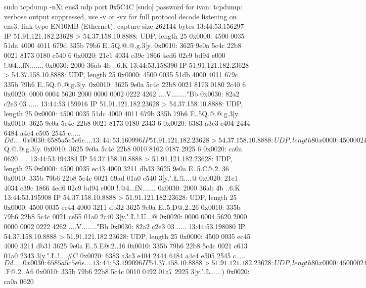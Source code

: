 sudo tcpdump -nXi ens3 udp port 0x5C4C
[sudo] password for ivan: 
tcpdump: verbose output suppressed, use -v or -vv for full protocol decode
listening on ens3, link-type EN10MB (Ethernet), capture size 262144 bytes
13:44:53.156297 IP 51.91.121.182.23628 > 54.37.158.10.8888: UDP, length 25
	0x0000:  4500 0035 51da 4000 4011 679d 335b 79b6  E..5Q.@.@.g.3[y.
	0x0010:  3625 9e0a 5c4c 22b8 0021 8173 0180 c540  6%
	0x0020:  21c1 4034 c39c 1866 4ed6 02c9 bd94 e000  !.@4...fN.......
	0x0030:  2000 36ab 4b                             ..6.K
13:44:53.158390 IP 51.91.121.182.23628 > 54.37.158.10.8888: UDP, length 25
	0x0000:  4500 0035 51db 4000 4011 679c 335b 79b6  E..5Q.@.@.g.3[y.
	0x0010:  3625 9e0a 5c4c 22b8 0021 8173 0180 2c40  6%
	0x0020:  0000 0004 5620 2000 0000 0002 0222 4262  ....V........"Bb
	0x0030:  82a2 c2e3 03                             .....
13:44:53.159916 IP 51.91.121.182.23628 > 54.37.158.10.8888: UDP, length 25
	0x0000:  4500 0035 51dc 4000 4011 679b 335b 79b6  E..5Q.@.@.g.3[y.
	0x0010:  3625 9e0a 5c4c 22b8 0021 8173 0180 2343  6%
	0x0020:  6383 a3c3 e404 2444 6484 a4c4 e505 2545  c.....$Dd.....%
	0x0030:  6585 a5c5 e6                             e....
13:44:53.160996 IP 51.91.121.182.23628 > 54.37.158.10.8888: UDP, length 8
	0x0000:  4500 0024 51dd 4000 4011 67ab 335b 79b6  E..$Q.@.@.g.3[y.
	0x0010:  3625 9e0a 5c4c 22b8 0010 8162 0187 2925  6%
	0x0020:  ca0a 0620                                ....
13:44:53.194384 IP 54.37.158.10.8888 > 51.91.121.182.23628: UDP, length 25
	0x0000:  4500 0035 ec43 4000 3211 db33 3625 9e0a  E..5.C@.2..36%
	0x0010:  335b 79b6 22b8 5c4c 0021 69ad 01a0 c540  3[y.".\L.!i....@
	0x0020:  21c1 4034 c39c 1866 4ed6 02c9 bd94 e000  !.@4...fN.......
	0x0030:  2000 36ab 4b                             ..6.K
13:44:53.195908 IP 54.37.158.10.8888 > 51.91.121.182.23628: UDP, length 25
	0x0000:  4500 0035 ec44 4000 3211 db32 3625 9e0a  E..5.D@.2..26%
	0x0010:  335b 79b6 22b8 5c4c 0021 ce55 01a0 2c40  3[y.".\L.!.U..,@
	0x0020:  0000 0004 5620 2000 0000 0002 0222 4262  ....V........"Bb
	0x0030:  82a2 c2e3 03                             .....
13:44:53.198080 IP 54.37.158.10.8888 > 51.91.121.182.23628: UDP, length 25
	0x0000:  4500 0035 ec45 4000 3211 db31 3625 9e0a  E..5.E@.2..16%
	0x0010:  335b 79b6 22b8 5c4c 0021 c613 01a0 2343  3[y.".\L.!....#C
	0x0020:  6383 a3c3 e404 2444 6484 a4c4 e505 2545  c.....$Dd.....%
	0x0030:  6585 a5c5 e6                             e....
13:44:53.199096 IP 54.37.158.10.8888 > 51.91.121.182.23628: UDP, length 8
	0x0000:  4500 0024 ec46 4000 3211 db41 3625 9e0a  E..$.F@.2..A6%
	0x0010:  335b 79b6 22b8 5c4c 0010 0492 01a7 2925  3[y.".\L......)%
	0x0020:  ca0a 0620